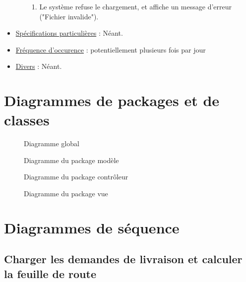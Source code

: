 \documentclass[a4paper]{report}
\newcommand{\adjustimg}{\ifodd\value{page}\hspace*{\dimexpr\evensidemargin-\oddsidemargin}\else\hspace*{-\dimexpr\evensidemargin-\oddsidemargin}\fi}
\newcommand{\centerimg}[2][width=\textwidth]{\makebox[\textwidth]{\adjustimg\texttt{[image: \#2]}}}
\begin{document}
\begin{itemize}[label = \textbullet, font = \color{orange}]
\begin{enumerate}
            \begin{enumerate}
                \item Le système refuse le chargement, et affiche un message
                    d'erreur ("Fichier invalide").
            \end{enumerate}
    \end{enumerate}
    \item \underline{Spécifications particulières} : Néant.
    \item \underline{Fréquence d'occurence} : potentiellement plusieurs fois
        par jour
    \item \underline{Divers} : Néant.
\end{itemize}

\pagebreak

\section{Diagrammes de packages et de classes}

\begin{figure}[H]
    \noindent\centerimg[width=\paperwidth, height=500pt]{images/ClassDiagram}
    \caption{Diagramme global}
\end{figure}

\begin{figure}[H]
    \noindent\centerimg[width=\paperwidth, height=700pt]{images/model}
    \caption{Diagramme du package modèle}
\end{figure}

\begin{figure}[H]
    \noindent\centerimg{images/controller}
    \caption{Diagramme du package contrôleur}
\end{figure}

\begin{figure}[H]
    \noindent\centerimg{images/view}
    \caption{Diagramme du package vue}
\end{figure}

\pagebreak

\section{Diagrammes de séquence}

\subsection{Charger les demandes de livraison et calculer la feuille de route}
\end{document}
